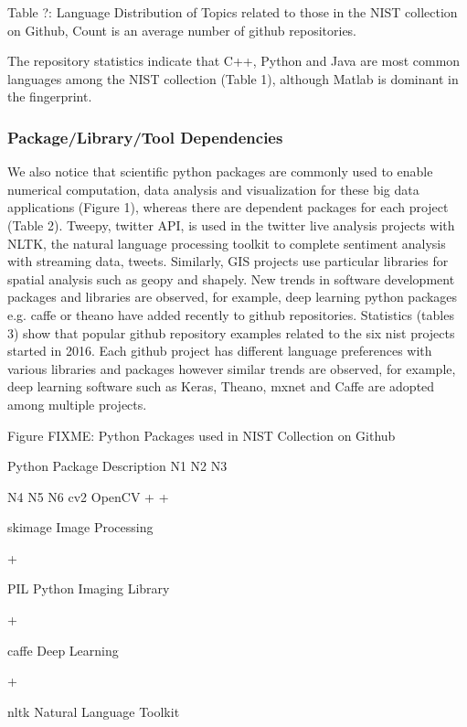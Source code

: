 \documentclass[9pt,twocolumn,twoside]{styles/osajnl}
\begin{document}
	Table ?:  Language Distribution of Topics related to those in the NIST collection on Github, Count is an average number of github repositories.


The repository statistics indicate that C++, Python and Java are most common languages among the NIST collection (Table 1), although Matlab is dominant in the fingerprint. 
\subsubsection{Package/Library/Tool Dependencies}

We also notice that scientific python packages are commonly used to
enable numerical computation, data analysis and visualization for
these big data applications (Figure 1), whereas there are dependent
packages for each project (Table 2). Tweepy, twitter API, is used in
the twitter live analysis projects with NLTK, the natural language
processing toolkit to complete sentiment analysis with streaming data,
tweets. Similarly, GIS projects use particular libraries for spatial
analysis such as geopy and shapely. New trends in software development
packages and libraries are observed, for example, deep learning python
packages e.g. caffe or theano have added recently to github
repositories. Statistics (tables 3) show that popular github
repository examples related to the six nist projects started in
2016. Each github project has different language preferences with
various libraries and packages however similar trends are observed,
for example, deep learning software such as Keras, Theano, mxnet and
Caffe are adopted among multiple projects.



  

Figure FIXME: Python Packages used in NIST Collection on Github

Python Package
	Description
	N1
	N2
	N3

	N4
	N5
	N6
	cv2
	OpenCV
	+
	+
	 
	 
	 
	 
	skimage
	Image Processing
	 
	+
	 
	 
	 
	 
	PIL
	Python Imaging Library
	 
	+
	 
	 
	 
	 
	caffe
	Deep Learning
	 
	+
	 
	 
	 
	 
	nltk
	Natural Language Toolkit
	 
\end{document}
